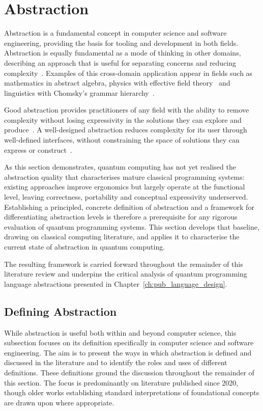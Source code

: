 \section{Abstraction}\label{sec:lit_rev:abstraction}
Abstraction is a fundamental concept in computer science and software engineering, providing the basis for tooling and development in both fields.
Abstraction is equally fundamental as a mode of thinking in other domains, describing an approach that is useful for separating concerns and reducing complexity~\cite{Wing2006ComputationalThinking}.
Examples of this cross-domain application appear in fields such as mathematics in abstract algebra, physics with effective field theory~\cite{Burgess2020EFT} and linguistics with Chomsky's grammar hierarchy~\cite{Chomsky1957SyntacticStructures}.

Good abstraction provides practitioners of any field with the ability to remove complexity without losing expressivity in the solutions they can explore and produce~\cite{parnas1972criteria,aho2022abstractions}.
A well-designed abstraction reduces complexity for its user through well-defined interfaces, without constraining the space of solutions they can express or construct~\cite{parnas1972criteria}.

As this section demonstrates, quantum computing has not yet realised the abstraction quality that characterises mature classical programming systems: existing approaches improve ergonomics but largely operate at the functional level, leaving correctness, portability and conceptual expressivity underserved.
Establishing a principled, concrete definition of abstraction and a framework for differentiating abstraction levels is therefore a prerequisite for any rigorous evaluation of quantum programming systems.
This section develops that baseline, drawing on classical computing literature, and applies it to characterise the current state of abstraction in quantum computing.

The resulting framework is carried forward throughout the remainder of this literature review and underpins the critical analysis of quantum programming language abstractions presented in Chapter~\ref{ch:pub_language_design}.

\subsection{Defining Abstraction}\label{subsec:lit_rev:abstraction:defining_abstraction}
While abstraction is useful both within and beyond computer science, this subsection focuses on its definition specifically in computer science and software engineering.
The aim is to present the ways in which abstraction is defined and discussed in the literature and to identify the roles and uses of different definitions.
These definitions ground the discussion throughout the remainder of this section.
The focus is predominantly on literature published since 2020, though older works establishing standard interpretations of foundational concepts are drawn upon where appropriate.

